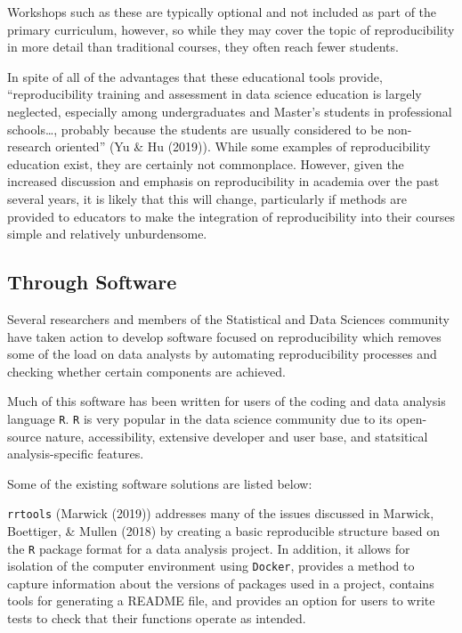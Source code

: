 \documentclass[12pt,twoside]{reedthesis}
\begin{document}
Workshops such as these are typically optional and not included as part
of the primary curriculum, however, so while they may cover the topic of
reproducibility in more detail than traditional courses, they often
reach fewer students.

In spite of all of the advantages that these educational tools provide,
``reproducibility training and assessment in data science education is
largely neglected, especially among undergraduates and Master's students
in professional schools\ldots{}, probably because the students are
usually considered to be non-research oriented'' (Yu \& Hu (2019)).
While some examples of reproducibility education exist, they are
certainly not commonplace. However, given the increased discussion and
emphasis on reproducibility in academia over the past several years, it
is likely that this will change, particularly if methods are provided to
educators to make the integration of reproducibility into their courses
simple and relatively unburdensome.

\subsection{Through Software}\label{through-software}

Several researchers and members of the Statistical and Data Sciences
community have taken action to develop software focused on
reproducibility which removes some of the load on data analysts by
automating reproducibility processes and checking whether certain
components are achieved.

Much of this software has been written for users of the coding and data
analysis language \texttt{R}. \texttt{R} is very popular in the data
science community due to its open-source nature, accessibility,
extensive developer and user base, and statsitical analysis-specific
features.

Some of the existing software solutions are listed below:

\texttt{rrtools} (Marwick (2019)) addresses many of the issues discussed
in Marwick, Boettiger, \& Mullen (2018) by creating a basic reproducible
structure based on the \texttt{R} package format for a data analysis
project. In addition, it allows for isolation of the computer
environment using \texttt{Docker}, provides a method to capture
information about the versions of packages used in a project, contains
tools for generating a README file, and provides an option for users to
write tests to check that their functions operate as intended.
\end{document}
